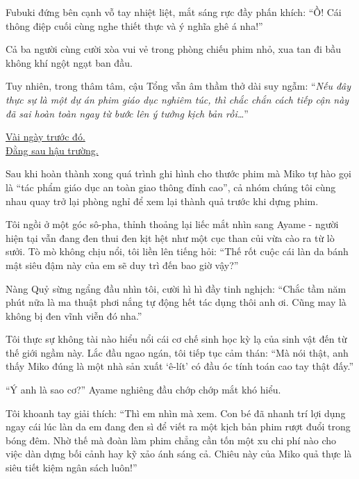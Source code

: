 \documentclass[../main.tex]{subfiles}
\begin{document}
Fubuki đứng bên cạnh vỗ tay nhiệt liệt, mắt sáng rực đầy phấn khích:
``Ồ! Cái thông điệp cuối cùng nghe thiết thực và ý nghĩa ghê á nha!''

Cả ba người cùng cười xòa vui vẻ trong phòng chiếu phim nhỏ, xua tan đi bầu không khí ngột ngạt ban đầu.

Tuy nhiên, trong thâm tâm, cậu Tổng vẫn âm thầm thở dài suy ngẫm: ``\textit{Nếu đây thực sự là một dự án phim giáo dục nghiêm túc, thì chắc chắn cách tiếp cận này đã sai hoàn toàn ngay từ bước lên ý tưởng kịch bản rồi\dots}''

\omk

\begin{center}
  \uline{
    Vài ngày trước đó. \\
    Đằng sau hậu trường.}
\end{center}


Sau khi hoàn thành xong quá trình ghi hình cho thước phim mà Miko tự hào gọi là ``tác phẩm giáo dục an toàn giao thông đỉnh cao'', cả nhóm chúng tôi cùng nhau quay trở lại phòng nghỉ để xem lại thành quả trước khi dựng phim.

Tôi ngồi ở một góc sô-pha, thỉnh thoảng lại liếc mắt nhìn sang Ayame - người hiện tại vẫn đang đen thui đen kịt hệt như một cục than củi vừa cào ra từ lò sưởi. Tò mò không chịu nổi, tôi liền lên tiếng hỏi: ``Thế rốt cuộc cái làn da bánh mật siêu đậm này của em sẽ duy trì đến bao giờ vậy?''

Nàng Quỷ sừng ngẩng đầu nhìn tôi, cười hì hì đầy tinh nghịch:
``Chắc tầm năm phút nữa là ma thuật phơi nắng tự động hết tác dụng thôi anh ơi. Cũng may là không bị đen vĩnh viễn đó nha.''

Tôi thực sự không tài nào hiểu nổi cái cơ chế sinh học kỳ lạ của sinh vật đến từ thế giới ngầm này. Lắc đầu ngao ngán, tôi tiếp tục cảm thán:
``Mà nói thật, anh thấy Miko đúng là một nhà sản xuất `ê-lít' có đầu óc tính toán cao tay thật đấy.''

``Ý anh là sao cơ?'' Ayame nghiêng đầu chớp chớp mắt khó hiểu.

Tôi khoanh tay giải thích:
``Thì em nhìn mà xem. Con bé đã nhanh trí lợi dụng ngay cái lúc làn da em đang đen sì để viết ra một kịch bản phim rượt đuổi trong bóng đêm. Nhờ thế mà đoàn làm phim chẳng cần tốn một xu chi phí nào cho việc dàn dựng bối cảnh hay kỹ xảo ánh sáng cả. Chiêu này của Miko quả thực là siêu tiết kiệm ngân sách luôn!''
\end{document}
